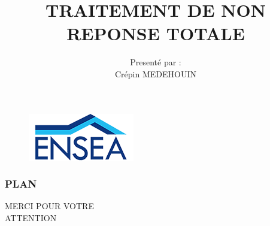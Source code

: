 \documentclass[
	11pt, %
]{beamer}
\title[Répondération ]{TRAITEMENT DE NON REPONSE TOTALE}
\author[Traitement de la non-réponse totale]{Presenté par : \\ Crépin  MEDEHOUIN  \vspace{0.8cm}  }
\institute[]{Formateur : Dr. KOUAME Darès }
\date[2024 - 2025]{}
\begin{document}

\begin{frame}
	\begin{figure}
		\includegraphics[width=0.45\linewidth]{img/logo_ensea.png}
	\end{figure}
	\titlepage %
\end{frame}


\begin{frame}
	\frametitle{PLAN} %
	\tableofcontents %
\end{frame}



 
 
 
 


\begin{frame}
	\begin{center}
		{\Huge MERCI POUR VOTRE \\ }
		{\Huge \vspace{0.5cm}}
		{\Huge ATTENTION}
	\end{center}
\end{frame}

\end{document}
